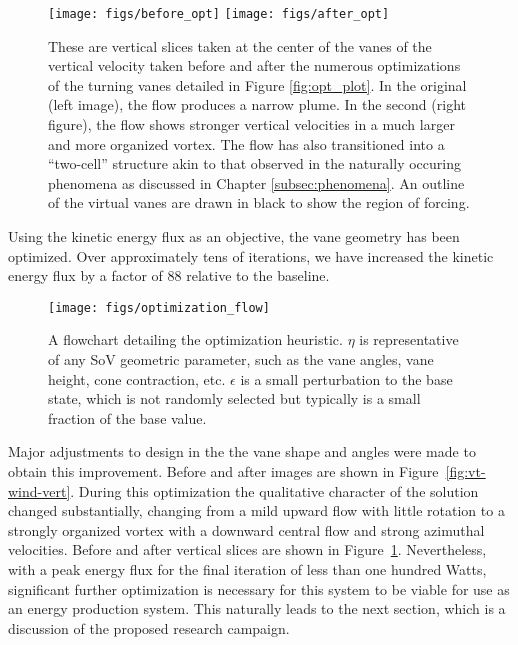 \begin{figure}[htb]
  \centering
 \texttt{[image: figs/before\_opt]}
 \hfill
 \texttt{[image: figs/after\_opt]} \\
  \caption{These are vertical slices taken at the center of the vanes of
 the vertical velocity taken before and after the numerous optimizations
 of the turning vanes detailed in Figure \ref{fig:opt_plot}. In the
 original (left image), the flow produces a narrow plume. In the second
 (right figure), the flow shows stronger vertical velocities in a much
 larger and more organized vortex. The flow has also transitioned into a
 ``two-cell'' structure akin to that observed in the naturally occuring
 phenomena as discussed in Chapter \ref{subsec:phenomena}. An outline of
 the virtual vanes are drawn in black to show the region of forcing.}
  \label{fig:opt_flow}
\end{figure}


Using the kinetic energy flux as an objective, the vane geometry has
been optimized. Over approximately tens of iterations, we have
increased the kinetic energy flux by a factor of 88 relative to the
baseline. 

\begin{figure}[htb]
 \centering
 \texttt{[image: figs/optimization\_flow]}
 \caption{A flowchart detailing the optimization heuristic. $\eta$ is
 representative of any SoV geometric parameter, such as the vane angles,
 vane height, cone contraction, etc. $\epsilon$ is a small perturbation
 to the base state, which is not randomly selected but typically is a
 small fraction of the base value. }
 \label{fig:opt_image}
\end{figure}


Major adjustments to design in the the vane
shape and angles were made to obtain this improvement. Before and after
images are shown in Figure~\ref{fig:vt-wind-vert}. During this
optimization the 
qualitative character of the solution changed substantially, changing
from a mild upward flow with little rotation to a strongly organized
vortex with a downward central flow and strong azimuthal
velocities. Before and after vertical slices are shown in
Figure~\ref{fig:opt_flow}. Nevertheless, with a peak energy flux for the
final iteration of less than one hundred Watts, significant further 
optimization is necessary for this system to be viable for use as an 
energy production system. This naturally leads to the next section,
which is a discussion of the proposed research campaign. 

